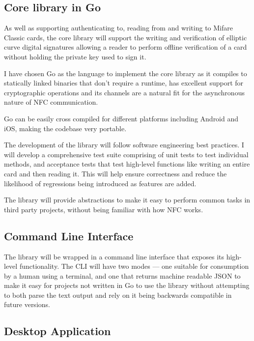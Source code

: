 \documentclass[a4paper, 12pt]{article}
\begin{document}
  \subsection*{Core library in Go}

  As well as supporting authenticating to, reading from and writing to Mifare
  Classic cards, the core library will support the writing and verification of
  elliptic curve digital signatures allowing a reader to perform offline
  verification of a card without holding the private key used to sign it.

  I have chosen Go as the language to implement the core library as it compiles
  to statically linked binaries that don't require a runtime, has excellent
  support for cryptographic operations and its channels are a natural fit for
  the asynchronous nature of NFC communication.

  Go can be easily cross compiled for different platforms including Android and
  iOS, making the codebase very portable.

  The development of the library will follow software engineering best
  practices. I will develop a comprehensive test suite comprising of unit tests
  to test individual methods, and acceptance tests that test high-level
  functions like writing an entire card and then reading it. This will help
  ensure correctness and reduce the likelihood of regressions being introduced
  as features are added.

  The library will provide abstractions to make it easy to perform common tasks
  in third party projects, without being familiar with how NFC works.


  \subsection*{Command Line Interface}

  The library will be wrapped in a command line interface that exposes its
  high-level functionality. The CLI will have two modes --- one suitable for
  consumption by a human using a terminal, and one that returns machine readable
  JSON to make it easy for projects not written in Go to use the library without
  attempting to both parse the text output and rely on it being backwards
  compatible in future versions.


  \subsection*{Desktop Application}
\end{document}

